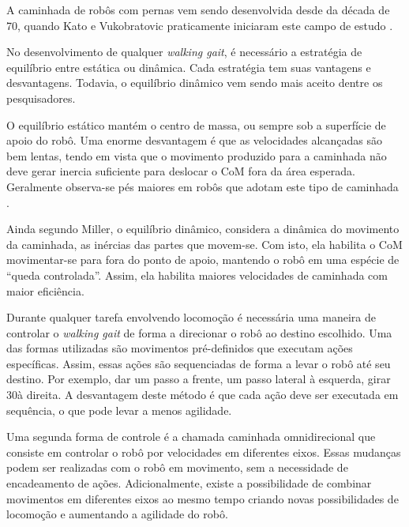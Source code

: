 \begin{draft}
A caminhada de robôs com pernas vem sendo desenvolvida desde da década de 70, quando Kato e Vukobratovic praticamente iniciaram este campo de estudo \cite{kajita2008}.

\begin{draft}
	No desenvolvimento de qualquer \textit{walking gait}, é necessário a estratégia de equilíbrio entre estática ou dinâmica. Cada estratégia tem suas vantagens e desvantagens. Todavia, o equilíbrio dinâmico vem sendo mais aceito dentre os pesquisadores.
\end{draft}

O equilíbrio estático mantém o centro de massa, ou  sempre sob a superfície de apoio do robô. Uma enorme desvantagem é que as velocidades alcançadas são bem lentas, tendo em vista que o movimento produzido para a caminhada não deve gerar inercia suficiente para deslocar o CoM fora da área esperada. Geralmente observa-se pés maiores em robôs que adotam este tipo de caminhada \cite{miller1994}.

Ainda segundo Miller, o equilíbrio dinâmico, considera a dinâmica do movimento da caminhada, as inércias das partes que movem-se. Com isto, ela habilita o CoM movimentar-se para fora do ponto de apoio, mantendo o robô em uma espécie de ``queda controlada''. Assim, ela habilita maiores velocidades de caminhada com maior eficiência.


Durante qualquer tarefa envolvendo locomoção é necessária uma maneira de controlar o \textit{walking gait} de forma a direcionar o robô ao destino escolhido. Uma das formas utilizadas são movimentos pré-definidos que executam ações específicas. Assim, essas ações são sequenciadas de forma a levar o robô até seu destino. Por exemplo, dar um passo a frente, um passo lateral à esquerda, girar 30\degree à direita. A desvantagem deste método é que cada ação deve ser executada em sequência, o que pode levar a menos agilidade.

Uma segunda forma de controle é a chamada caminhada omnidirecional que consiste em controlar o robô por velocidades em diferentes eixos. Essas mudanças podem ser realizadas com o robô em movimento, sem a necessidade de encadeamento de ações. Adicionalmente, existe a possibilidade de combinar movimentos em diferentes eixos ao mesmo tempo criando novas possibilidades de locomoção e aumentando a agilidade do robô.
\end{draft}

